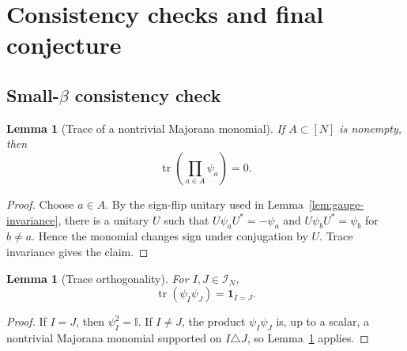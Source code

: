 \documentclass[11pt]{article}
\newtheorem{lemma}[theorem]{Lemma}
\newcommand{\tr}{\operatorname{tr}}
\newcommand{\I}{\mathbb{I}}
\newcommand{\calI}{\mathcal{I}}
\newcommand{\ind}{\mathbf{1}}
\begin{document}
\section{Consistency checks and final conjecture}
\label{sec:checks-conjecture}

\subsection{\texorpdfstring{Small-$\beta$ consistency check}{Small-beta consistency check}}

\begin{lemma}[Trace of a nontrivial Majorana monomial]\label{lem:trace-monomial-zero}
  If $A\subset[N]$ is nonempty, then
  \begin{equation}\label{eq:trace-monomial-zero}
    \tr\left(\prod_{a\in A}\psi_a\right)=0.
  \end{equation}
\end{lemma}

\begin{proof}
  Choose $a\in A$.  By the sign-flip unitary used in
  Lemma~\ref{lem:gauge-invariance}, there is a unitary $U$ such that
  $U\psi_aU^*=-\psi_a$ and $U\psi_bU^*=\psi_b$ for $b\neq a$.  Hence the
  monomial changes sign under conjugation by $U$.  Trace invariance gives the
  claim.
\end{proof}

\begin{lemma}[Trace orthogonality]\label{lem:trace-orth}
  For $I,J\in\calI_N$,
  \begin{equation}\label{eq:trace-orth}
    \tr(\psi_I\psi_J)=\ind_{I=J}.
  \end{equation}
\end{lemma}

\begin{proof}
  If $I=J$, then $\psi_I^2=\I$.  If $I\neq J$, the product
  $\psi_I\psi_J$ is, up to a scalar, a nontrivial Majorana monomial supported
  on $I\triangle J$, so Lemma~\ref{lem:trace-monomial-zero} applies.
\end{proof}
\end{document}
